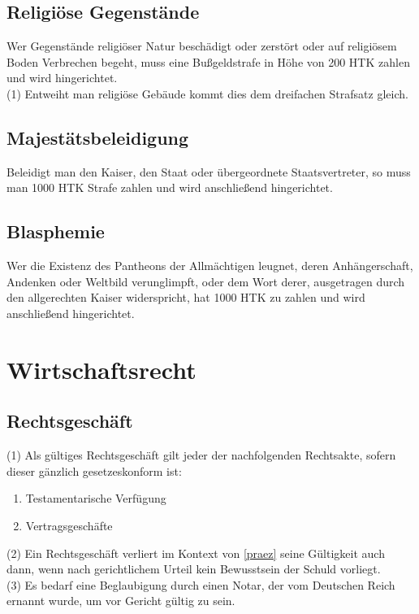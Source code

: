 \documentclass{article}
\begin{document}
\subsection{Religiöse Gegenstände}
Wer Gegenstände religiöser Natur beschädigt oder zerstört oder auf religiösem Boden Verbrechen begeht, muss eine Bußgeldstrafe in Höhe von 200 HTK zahlen und wird hingerichtet.\\
(1) Entweiht man religiöse Gebäude kommt dies dem dreifachen Strafsatz gleich.

\subsection{Majestätsbeleidigung}
Beleidigt man den Kaiser, den Staat oder übergeordnete Staatsvertreter, so muss man 1000 HTK Strafe zahlen und wird anschließend hingerichtet.

\subsection{Blasphemie}
Wer die Existenz des Pantheons der Allmächtigen leugnet, deren Anhängerschaft, Andenken oder Weltbild verunglimpft, oder dem Wort derer, ausgetragen durch den allgerechten Kaiser widerspricht, hat 1000 HTK zu zahlen und wird anschließend hingerichtet.

\section{Wirtschaftsrecht}

\subsection{Rechtsgeschäft} \label{rechtsg}
(1) Als gültiges Rechtsgeschäft gilt jeder der nachfolgenden Rechtsakte, sofern dieser gänzlich gesetzeskonform ist:
\begin{enumerate}
	\item Testamentarische Verfügung
	\item Vertragsgeschäfte
\end{enumerate}
(2) Ein Rechtsgeschäft verliert im Kontext von \ref{praez} seine Gültigkeit auch dann, wenn nach gerichtlichem Urteil kein Bewusstsein der Schuld vorliegt.\\
(3) Es bedarf eine Beglaubigung durch einen Notar, der vom Deutschen Reich ernannt wurde, um vor Gericht gültig zu sein.
\end{document}
